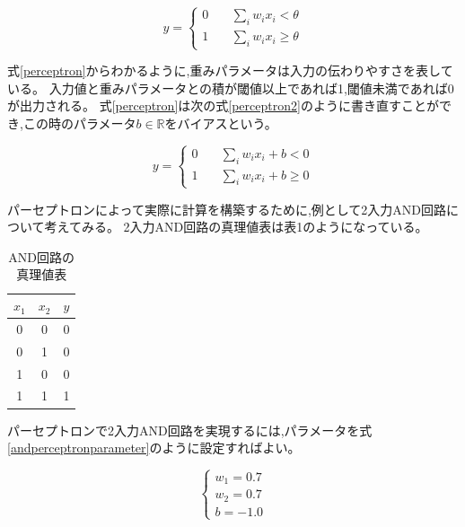   \begin{equation}
    \label{perceptron}
    y =
    \left\{
    \begin{aligned}
      0 \quad &\sum_i{w_i x_i} < \theta \\
      1 \quad &\sum_i{w_i x_i} \geq \theta
    \end{aligned}
    \right.
  \end{equation}

  式\ref{perceptron}からわかるように,重みパラメータは入力の伝わりやすさを表している。
  入力値と重みパラメータとの積が閾値以上であれば1,閾値未満であれば0が出力される。
  式\ref{perceptron}は次の式\ref{perceptron2}のように書き直すことができ,この時のパラメータ$b\in \mathbb{R}$をバイアスという。

  \begin{equation}
    \label{perceptron2}
    y =
    \left\{
    \begin{aligned}
      0 \quad &\sum_i{w_i x_i} + b < 0 \\
      1 \quad &\sum_i{w_i x_i} + b \geq 0
    \end{aligned}
    \right.
  \end{equation}

  パーセプトロンによって実際に計算を構築するために,例として2入力AND回路について考えてみる。
  2入力AND回路の真理値表は表1のようになっている。

  \begin{table}[htb]
    \centering
    \caption{AND回路の真理値表}
    \begin{tabular}{|c|c|c|} \hline
      $x_1$ & $x_2$ & $y$ \\ \hline
      0 & 0 & 0 \\ \hline
      0 & 1 & 0 \\ \hline
      1 & 0 & 0 \\ \hline
      1 & 1 & 1 \\ \hline
    \end{tabular}
  \end{table}

  パーセプトロンで2入力AND回路を実現するには,パラメータを式\ref{andperceptronparameter}のように設定すればよい。

  \begin{equation}
    \label{andperceptronparameter}
    \left\{
      \begin{aligned}
        w_1 = 0.7 \\
        w_2 = 0.7 \\
        b = -1.0
      \end{aligned}
    \right.
  \end{equation}

